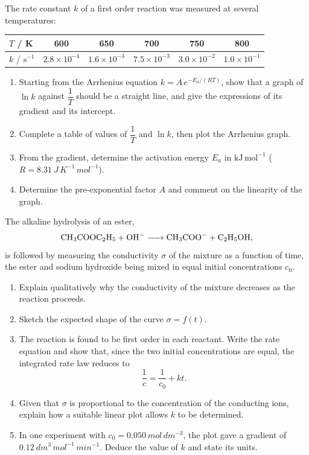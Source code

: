 \documentclass[11pt]{article}
\begin{document}
\begin{exercice}
The rate constant $k$ of a first order reaction was measured at several temperatures:
\begin{center}
\begin{tabular}{|l|c|c|c|c|c|}
\hline
\rowcolor{popblueL} $T$ / K & 600 & 650 & 700 & 750 & 800 \\
\hline $k$ / $\mathrm{s^{-1}}$ & $2.8\times 10^{-4}$ & $1.6\times 10^{-3}$ & $7.5\times 10^{-3}$ & $3.0\times 10^{-2}$ & $1.0\times 10^{-1}$ \\
\hline
\end{tabular}
\end{center}
\begin{enumerate}
\item Starting from the Arrhenius equation $k = A\,e^{-E_a/(RT)}$, show that a graph of $\ln k$ against $\dfrac{1}{T}$ should be a straight line, and give the expressions of its gradient and its intercept.
\item Complete a table of values of $\dfrac{1}{T}$ and $\ln k$, then plot the Arrhenius graph.
\item From the gradient, determine the activation energy $E_a$ in $\mathrm{kJ\,mol^{-1}}$ ($R = \SI{8.31}{J\,K^{-1}\,mol^{-1}}$).
\item Determine the pre-exponential factor $A$ and comment on the linearity of the graph.
\end{enumerate}
\end{exercice}

\begin{exercice}
The alkaline hydrolysis of an ester,
\[
\ce{CH3COOC2H5 + OH- -> CH3COO- + C2H5OH},
\]
is followed by measuring the conductivity $\sigma$ of the mixture as a function of time, the ester and sodium hydroxide being mixed in equal initial concentrations $c_0$.
\begin{enumerate}
\item Explain qualitatively why the conductivity of the mixture decreases as the reaction proceeds.
\item Sketch the expected shape of the curve $\sigma = f(t)$.
\item The reaction is found to be first order in each reactant. Write the rate equation and show that, since the two initial concentrations are equal, the integrated rate law reduces to
\[
\frac{1}{c} = \frac{1}{c_0} + kt.
\]
\item Given that $\sigma$ is proportional to the concentration of the conducting ions, explain how a suitable linear plot allows $k$ to be determined.
\item In one experiment with $c_0 = \SI{0.050}{mol\,dm^{-3}}$, the plot gave a gradient of $\SI{0.12}{dm^{3}\,mol^{-1}\,min^{-1}}$. Deduce the value of $k$ and state its units.
\end{enumerate}
\end{exercice}
\end{document}
